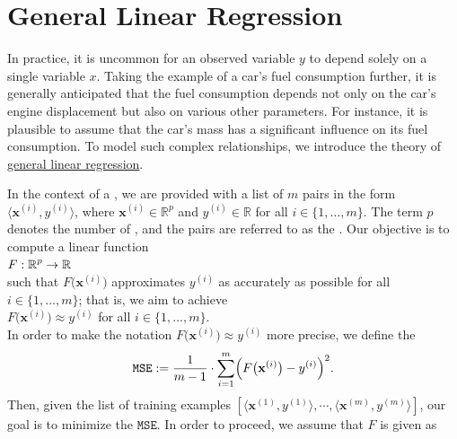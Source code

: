 \section{General Linear Regression}
In practice, it is uncommon for an observed variable $y$ to depend solely on a single variable $x$. Taking the
example of a car's fuel consumption further, it is generally anticipated that the fuel consumption depends not
only on the car's engine displacement but also on various other parameters. For instance, it is plausible to 
assume that the car's mass has a  significant influence on its fuel consumption. To model such complex
relationships, we introduce the theory of \href{https://en.wikipedia.org/wiki/Linear_regression}{general linear regression}. 

In the context of a , we are provided with a list of $m$ pairs in the form $\langle\mathbf{x}^{(i)}, y^{(i)} \rangle$, where $\mathbf{x}^{(i)} \in \mathbb{R}^p$ and $y^{(i)} \in \mathbb{R}$ for all $i \in \{1, \ldots, m\}$. The term $p$ denotes the number of , and the pairs are referred to as the . Our objective is to compute a linear function
\\[0.2cm]
\hspace*{1.3cm}
$\displaystyle F:\mathbb{R}^p \rightarrow \mathbb{R}$
\\[0.2cm]
such that $F\bigl(\mathbf{x}^{(i)}\bigr)$ approximates $y^{(i)}$ as accurately as possible for all $i \in \{1, \ldots, m\}$; that is, we aim to achieve
\\[0.2cm]
\hspace*{1.3cm}
$F\bigl(\mathbf{x}^{(i)}\bigr) \approx y^{(i)}$ \quad for all $i \in \{1, \ldots, m\}$.
\\[0.2cm]
In order to make the notation $F\bigl(\mathbf{x}^{(i)}\bigr) \approx y^{(i)}$ more precise, we
define the   
\begin{equation}
  \label{eq:squared-error-1}
  \mathtt{MSE} := \frac{1}{m-1} \cdot \sum\limits_{i=1}^{m} \Bigl(F\bigl(\mathbf{x}^{(i)}\bigr) - y^{(i)}\Bigr)^2. 
\end{equation}
Then, given the list of training examples
$[\langle \mathbf{x}^{(1)}, y^{(1)} \rangle, \cdots, \langle \mathbf{x}^{(m)}, y^{(m)} \rangle]$, our goal is to
minimize the $\mathtt{MSE}$.   
In order to proceed, we assume that $F$ is given as 
\\[0.2cm]
\hspace*{1.3cm}
